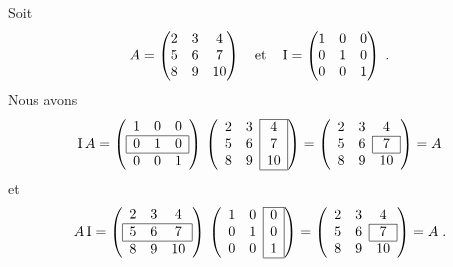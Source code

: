 {\begin{egg}
Soit
\[
A = \begin{pmatrix} 2 & 3 & 4 \\ 5 & 6 & 7 \\ 8 & 9 & 10 \end{pmatrix}
\quad \text{et} \quad
\operatorname{I} = \begin{pmatrix} 1 & 0 & 0 \\ 0 & 1 & 0 \\ 0 & 0 & 1 \end{pmatrix} \; .
\]
Nous avons
\[
\Id  A =
\left(
\begin{array}{cccc}
1 & 0 & 0 \\
\hline
\multicolumn{1}{|c}{0} & 1 & \multicolumn{1}{c|}{0} \\
\hline
0 & 0 & 1
\end{array}
\right)\,
\left(
\begin{array}{cccc}
\cline{3-3}
2 & 3 & \multicolumn{1}{|c|}{4} \\
5 & 6 & \multicolumn{1}{|c|}{7} \\
8 & 9 & \multicolumn{1}{|c|}{10} \\
\cline{3-3}
\end{array}
\right)
=
\left(
\begin{array}{cccc}
2 & 3 & 4 \\
\cline{3-3}
5 & 6 & \multicolumn{1}{|c|}{7} \\
\cline{3-3}
8 & 9 & 10
\end{array}
\right)
=A
\]
et
\[
A \Id =
\left(
\begin{array}{cccc}
2 & 3 & 4 \\
\hline
\multicolumn{1}{|c}{5} & 6 & \multicolumn{1}{c|}{7} \\
\hline
8 & 9 & 10
\end{array}
\right)\,
\left(
\begin{array}{cccc}
\cline{3-3}
1 & 0 & \multicolumn{1}{|c|}{0} \\
0 & 1 & \multicolumn{1}{|c|}{0} \\
0 & 0 & \multicolumn{1}{|c|}{1} \\
\cline{3-3}
\end{array}
\right)
=
\left(
\begin{array}{cccc}
2 & 3 & 4 \\
\cline{3-3}
5 & 6 & \multicolumn{1}{|c|}{7} \\
\cline{3-3}
8 & 9 & 10
\end{array}
\right)
=A \; .
\]
\end{egg}

}
